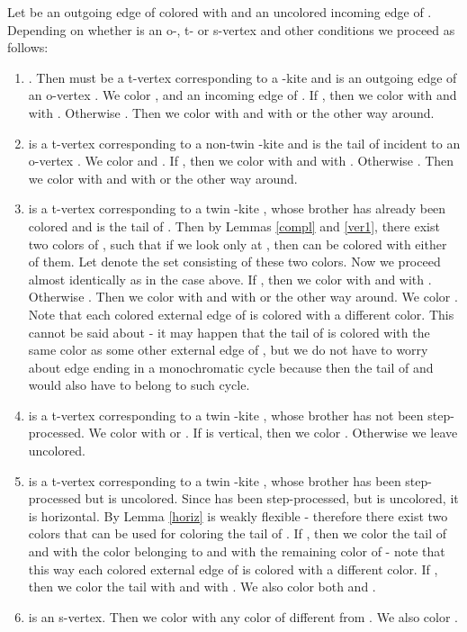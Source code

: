 \documentclass[a4, 11pt]{article}
\newcommand{\<}{\langle}
\renewcommand{\>}{\rangle}
\begin{document}
Let  be an outgoing edge of  colored with  and  an uncolored incoming edge of . Depending on whether  is an o-, t- or s-vertex and other conditions we proceed
as follows:
\begin{enumerate}
\item . Then  must be a t-vertex corresponding to a -kite  and  is an outgoing edge of an o-vertex . We color ,  and an incoming edge  of . If , then we  color  with  and  with . Otherwise . Then we color  with  and  with  or the other way around.

\item  is a t-vertex corresponding to a non-twin -kite  and  is the tail of  incident to an o-vertex . We color  and .  If , then we  color  with  and  with . Otherwise . Then we color  with  and  with  or the other way around.

\item  is a t-vertex corresponding to a twin -kite , whose brother  has already been colored and  is the tail of  . Then by Lemmas \ref{compl} and \ref{ver1}, there exist two colors of , such that if we look only at , then  can be colored with either of them. Let  denote the set consisting of these two colors.  Now we proceed almost identically as in the case above. If , then we  color  with  and  with . Otherwise . Then we color  with  and  with  or the other way around. We color . Note  that  each colored external edge of  is colored with a different color. This cannot be said about  - it may happen that the tail of  is colored with the same color as some other external edge  of , but we do not have to worry about edge  ending in a monochromatic cycle because then the tail of  and  would also have to belong to such cycle. 




\item  is a t-vertex corresponding to a twin -kite , whose brother  has not been step-processed.  We color  with  or .
If  is vertical, then we color . Otherwise we leave  uncolored.

\item  is a t-vertex corresponding to a twin -kite , whose brother  has  been step-processed but is uncolored. Since  has been step-processed, but is uncolored, it is horizontal.  By Lemma \ref{horiz}  is weakly flexible - therefore there exist two colors  that can be used for coloring the tail of . If , then we color the tail of  and  with the color belonging to   and  with the remaining color of  - note that this way each colored external edge of  is colored with a different color.  If , then we color the tail with  and  with .  We also color both  and .


\item  is an s-vertex. Then we color  with any color of  different from . We also color .

 
\end{enumerate}
\end{document}
